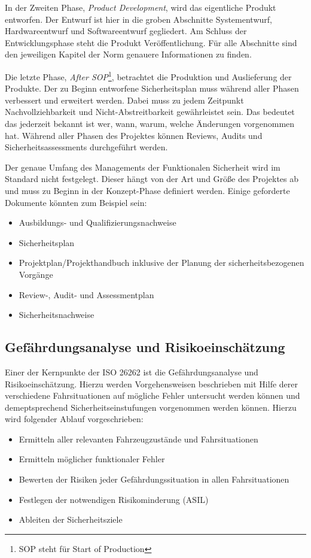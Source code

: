 \documentclass[
  a4paper,					    %
  twoside,
  DIV=calc,     				%
  bibliography=totoc,
  cleardoublepage=empty,
  ngerman,     					%
  final       					%
]{scrbook}
\begin{document}
In der Zweiten Phase, \emph{Product Development}, wird das eigentliche Produkt entworfen. Der Entwurf ist hier in die groben Abschnitte Systementwurf, Hardwareentwurf und Softwareentwurf gegliedert. Am Schluss der Entwicklungsphase steht die Produkt Veröffentlichung. Für alle Abschnitte sind den jeweiligen Kapitel der Norm genauere Informationen zu finden.

Die letzte Phase, \emph{After SOP}\footnote{SOP steht für Start of Production}, betrachtet die Produktion und Auslieferung der Produkte. Der zu Beginn entworfene Sicherheitsplan muss während aller Phasen verbessert und erweitert werden. Dabei muss zu jedem Zeitpunkt Nachvollziehbarkeit und Nicht-Abstreitbarkeit gewährleistet sein. Das bedeutet das jederzeit bekannt ist wer, wann, warum, welche Änderungen vorgenommen hat. Während aller Phasen des Projektes können Reviews, Audits und Sicherheitsassessments durchgeführt werden.

Der genaue Umfang des Managements der Funktionalen Sicherheit wird im Standard nicht festgelegt. Dieser hängt von der Art und Größe des Projektes ab und muss zu Beginn in der Konzept-Phase definiert werden. Einige geforderte Dokumente könnten zum Beispiel sein:

\begin{itemize}
    \item Ausbildungs- und Qualifizierungsnachweise
    \item Sicherheitsplan
    \item Projektplan/Projekthandbuch inklusive der Planung der sicherheitsbezogenen Vorgänge
    \item Review-, Audit- und Assessmentplan
    \item Sicherheitsnachweise
\end{itemize}

\subsection{Gefährdungsanalyse und Risikoeinschätzung}
\label{sec:ISO26262_GundR}
Einer der Kernpunkte der ISO 26262 ist die Gefährdungsanalyse und Risikoeinschätzung. Hierzu werden Vorgehensweisen beschrieben mit Hilfe derer verschiedene Fahrsituationen auf mögliche Fehler untersucht werden können und demeptsprechend Sicherheitseinstufungen vorgenommen werden können. Hierzu wird folgender Ablauf vorgeschrieben:

\begin{itemize}
    \item Ermitteln aller relevanten Fahrzeugzustände und Fahrsituationen
    \item Ermitteln möglicher funktionaler Fehler
    \item Bewerten der Risiken jeder Gefährdungssituation in allen Fahrsituationen
    \item Festlegen der notwendigen Risikominderung (ASIL)
    \item Ableiten der Sicherheitsziele
\end{itemize}
\end{document}

